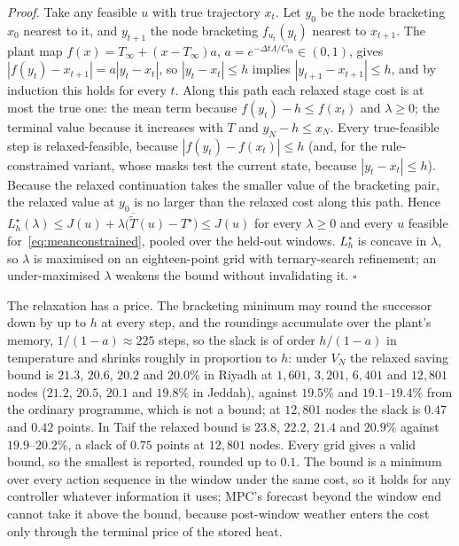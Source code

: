 \documentclass[3p,twocolumn,number]{elsarticle}
\newcommand{\Cth}{C_{\mathrm{th}}}
\begin{document}
\emph{Proof.} Take any feasible $u$ with true trajectory $x_t$. Let $y_0$ be the node bracketing $x_0$ nearest to it, and $y_{t+1}$ the node bracketing $f_{u_t}(y_t)$ nearest to $x_{t+1}$. The plant map $f(x)=T_\infty+(x-T_\infty)a$, $a=e^{-\Delta t\Lambda/\Cth}\in(0,1)$, gives $|f(y_t)-x_{t+1}|=a|y_t-x_t|$, so $|y_t-x_t|\le h$ implies $|y_{t+1}-x_{t+1}|\le h$, and by induction this holds for every $t$. Along this path each relaxed stage cost is at most the true one: the mean term because $f(y_t)-h\le f(x_t)$ and $\lambda\ge0$; the terminal value because it increases with $T$ and $y_N-h\le x_N$. Every true-feasible step is relaxed-feasible, because $|f(y_t)-f(x_t)|\le h$ (and, for the rule-constrained variant, whose masks test the current state, because $|y_t-x_t|\le h$). Because the relaxed continuation takes the smaller value of the bracketing pair, the relaxed value at $y_0$ is no larger than the relaxed cost along this path. Hence $L^{\star}_h(\lambda)\le J(u)+\lambda\bigl(\overline{\tilde T}(u)-T^{\star}\bigr)\le J(u)$ for every $\lambda\ge0$ and every $u$ feasible for~\eqref{eq:meanconstrained}, pooled over the held-out windows. $L^{\star}_h$ is concave in $\lambda$, so $\lambda$ is maximised on an eighteen-point grid with ternary-search refinement; an under-maximised $\lambda$ weakens the bound without invalidating it. \hfill$\square$

The relaxation has a price. The bracketing minimum may round the successor down by up to $h$ at every step, and the roundings accumulate over the plant's memory, $1/(1-a)\approx225$ steps, so the slack is of order $h/(1-a)$ in temperature and shrinks roughly in proportion to $h$: under $V_N$ the relaxed saving bound is $21.3$, $20.6$, $20.2$ and $20.0\%$ in Riyadh at $1{,}601$, $3{,}201$, $6{,}401$ and $12{,}801$ nodes ($21.2$, $20.5$, $20.1$ and $19.8\%$ in Jeddah), against $19.5\%$ and $19.1$--$19.4\%$ from the ordinary programme, which is not a bound; at $12{,}801$ nodes the slack is $0.47$ and $0.42$ points. In Taif the relaxed bound is $23.8$, $22.2$, $21.4$ and $20.9\%$ against $19.9$--$20.2\%$, a slack of $0.75$ points at $12{,}801$ nodes. Every grid gives a valid bound, so the smallest is reported, rounded up to $0.1$. The bound is a minimum over every action sequence in the window under the same cost, so it holds for any controller whatever information it uses; MPC's forecast beyond the window end cannot take it above the bound, because post-window weather enters the cost only through the terminal price of the stored heat.
\end{document}
